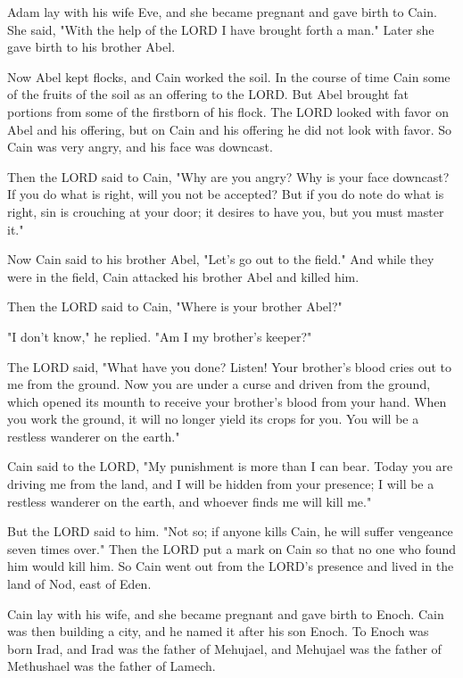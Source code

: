 \C Adam lay with his wife Eve, and she became pregnant and gave birth to Cain.
She said, "With the help of the LORD I have brought forth a man." \V Later she
gave birth to his brother Abel.

Now Abel kept flocks, and Cain worked the soil. \V In the course of time Cain
some of the fruits of the soil as an offering to the LORD. \V But Abel brought
fat portions from some of the firstborn of his flock. The LORD looked with favor
on Abel and his offering, \V but on Cain and his offering he did not look with
favor. So Cain was very angry, and his face was downcast.

\V Then the LORD said to Cain, "Why are you angry? Why is your face downcast? \V
If you do what is right, will you not be accepted? But if you do note do what is
right, sin is crouching at your door; it desires to have you, but you must
master it."

\V Now Cain said to his brother Abel, "Let's go out to the field." And while
they were in the field, Cain attacked his brother Abel and killed him.

\V Then the LORD said to Cain, "Where is your brother Abel?"

"I don't know," he replied. "Am I my brother's keeper?"

\V The LORD said, "What have you done? Listen! Your brother's blood cries out to
me from the ground. \V Now you are under a curse and driven from the ground,
which opened its mounth to receive your brother's blood from your hand. \V When
you work the ground, it will no longer yield its crops for you. You will be a
restless wanderer on the earth."

\V Cain said to the LORD, "My punishment is more than I can bear. \V Today you
are driving me from the land, and I will be hidden from your presence; I will be
a restless wanderer on the earth, and whoever finds me will kill me."

\V But the LORD said to him. "Not so; if anyone kills Cain, he will suffer
vengeance seven times over." Then the LORD put a mark on Cain so that no one who
found him would kill him. \V So Cain went out from the LORD's presence and lived
in the land of Nod, east of Eden.

\V Cain lay with his wife, and she became pregnant and gave birth to Enoch. Cain
was then building a city, and he named it after his son Enoch. \V To Enoch was
born Irad, and Irad was the father of Mehujael, and Mehujael was the father of
Methushael was the father of Lamech.

